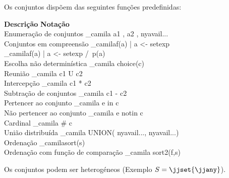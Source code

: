 \documentclass[portuges,a4paper]{article}
\begin{document}
Os conjuntos dispõem das seguintes funções predefinidas:

\begin{framed}
\noindent \textbf{Descrição}  \hfill  \textbf{Notação} \ \  \\
 Enumeração de conjuntos \dotfill \_camila{ { a1 , a2 , nyavail{...}} } \\
 Conjuntos em compreensão \dotfill \_camila{ {f(a)  | a <- setexp}} \\
 \mbox{} \hfill \_camila{ {f(a)  | a <- setexp /\ p(a)}} \\
 Escolha não determinística \dotfill \_camila{ choice(c) } \\
 Reunião  \dotfill \_camila{ c1 U c2 } \\
 Intercepção  \dotfill \_camila{ c1 * c2 } \\
 Subtração de conjuntos  \dotfill \_camila{ c1 - c2 } \\
 Pertencer ao conjunto \dotfill  \_camila{ e in c } \\
 Não pertencer ao conjunto  \dotfill  \_camila{ e notin c } \\
 Cardinal \dotfill  \_camila{ # c } \\
 União distribuída  \dotfill \_camila{ UNION( { {nyavail{...}}, nyavail{...}}) } \\
 Ordenação \dotfill \_camila{sort(s)} \\
 Ordenação com função de comparação  \dotfill \_camila{ sort2(f,s)}
\end{framed}

Os conjuntos podem ser heterogéneos (Exemplo $S=\jjset{\jjany}$).
\end{document}
